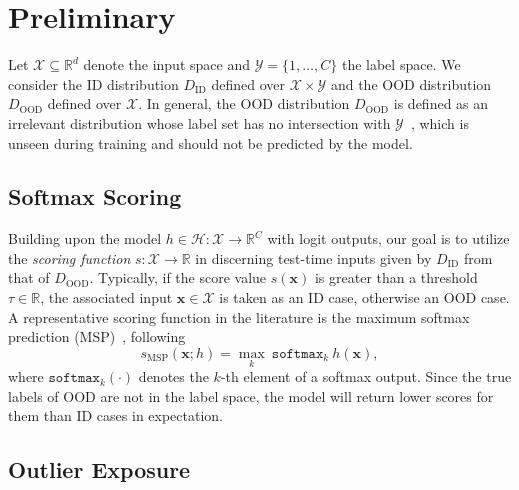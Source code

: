 \documentclass{article} \usepackage{iclr2022_conference,times}
\begin{document}
\section{Preliminary} \label{sec: related work}

Let $\mathcal{X}\subseteq\mathbb{R}^d$ denote the input space and $\mathcal{Y}=\{1,\ldots, C\}$ the label space. We consider the ID distribution $D_\text{ID}$ defined over $\mathcal{X}\times\mathcal{Y}$ and the OOD distribution $D_\text{OOD}$ defined over $\mathcal{X}$. In general, the OOD distribution $D_\text{OOD}$ is defined as an irrelevant distribution whose label set has no intersection with $\mathcal{Y}$~\citep{yang2021generalized}, which is unseen during training and should not be predicted by the model. 



\subsection{Softmax Scoring}

Building upon the model ${h}\in\mathcal{H}:\mathcal{X}\rightarrow\mathbb{R}^C$ with logit outputs, our goal is to utilize the \emph{scoring function} $s:\mathcal{X}\rightarrow \mathbb{R}$ in discerning test-time inputs given by $D_\text{ID}$ from that of $D_\text{OOD}$. Typically, if the score value $s(\boldsymbol{x})$ is greater than a threshold $\tau\in\mathbb{R}$, the associated input $\boldsymbol{x}\in\mathcal{X}$ is taken as an ID case, otherwise an OOD case. A representative scoring function in the literature is the maximum softmax prediction (MSP)~\citep{hendrycks2016baseline}, following
\begin{equation}
    s_\text{MSP}(\boldsymbol{x};h) = \max_k~\texttt{softmax}_k~h(\boldsymbol{x}),  \label{eq: softmax score}
\end{equation}
where $\texttt{softmax}_k (\cdot)$ denotes the $k$-th element of a softmax output. Since the true labels of OOD are not in the label space, the model will return lower scores for them than ID cases in expectation. 

\subsection{Outlier Exposure}
\end{document}
